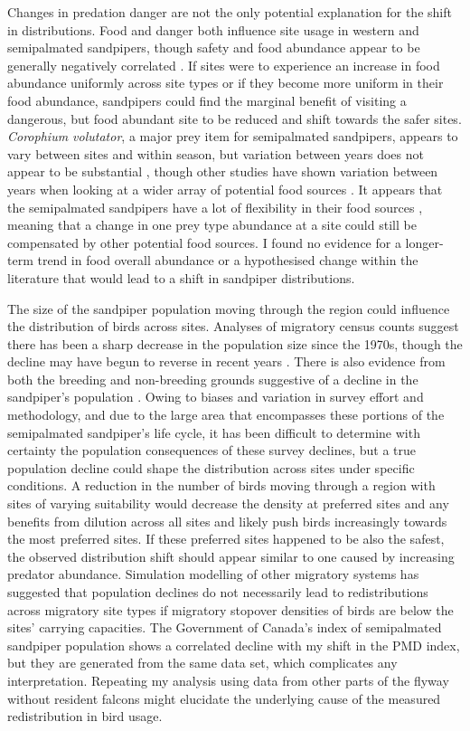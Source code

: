 Changes in predation danger are not the only potential explanation for the shift in distributions. Food and danger both influence site usage in western and semipalmated sandpipers, though safety and food abundance appear to be generally negatively correlated \citep{Pomeroy2008a,Sprague2008a}. If sites were to experience an increase in food abundance uniformly across site types or if they become more uniform in their food abundance, sandpipers could find the marginal benefit of visiting a dangerous, but food abundant site to be reduced and shift towards the safer sites. \textit{Corophium volutator}, a major prey item for semipalmated sandpipers, appears to vary between sites and within season, but variation between years does not appear to be substantial \citep{Barbeau2009a}, though other studies have shown variation between years when looking at a wider array of potential food sources \citep{Quinn2012a}. It appears that the semipalmated sandpipers have a lot of flexibility in their food sources \citep{Quinn2017}, meaning that a change in one prey type abundance at a site could still be compensated by other potential food sources. I found no evidence for a longer-term trend in food overall abundance or a hypothesised change within the literature that would lead to a shift in sandpiper distributions. 

The size of the sandpiper population moving through the region could influence the distribution of birds across sites. Analyses of migratory census counts suggest there has been a sharp decrease in the population size since the 1970s, though the decline may have begun to reverse in recent years \citep{bart_survey_2007,Andres2012b,Gratto-Trevor2012}. There is also evidence from both the breeding and non-breeding grounds suggestive of a decline in the sandpiper's population \citep{Smith2012a,morrison_dramatic_2012}. Owing to biases and variation in survey effort and methodology, and due to the large area that encompasses these portions of the semipalmated sandpiper's life cycle, it has been difficult to determine with certainty the population consequences of these survey declines, but a true population decline could shape the distribution across sites under specific conditions. A reduction in the number of birds moving through a region with sites of varying suitability would decrease the density at preferred sites and any benefits from dilution across all sites and likely push birds increasingly towards the most preferred sites. If these preferred sites happened to be also the safest, the observed distribution shift should appear similar to one caused by increasing predator abundance. Simulation modelling of other migratory systems has suggested that population declines do not necessarily lead to redistributions across migratory site types \citep{Taylor2007} if migratory stopover densities of birds are below the sites' carrying capacities. The Government of Canada's index of semipalmated sandpiper population \citep{GovernmentofCanada} shows a correlated decline with my shift in the PMD index, but they are generated from the same data set, which complicates any interpretation. Repeating my analysis using data from other parts of the flyway without resident falcons might elucidate the underlying cause of the measured redistribution in bird usage. 

